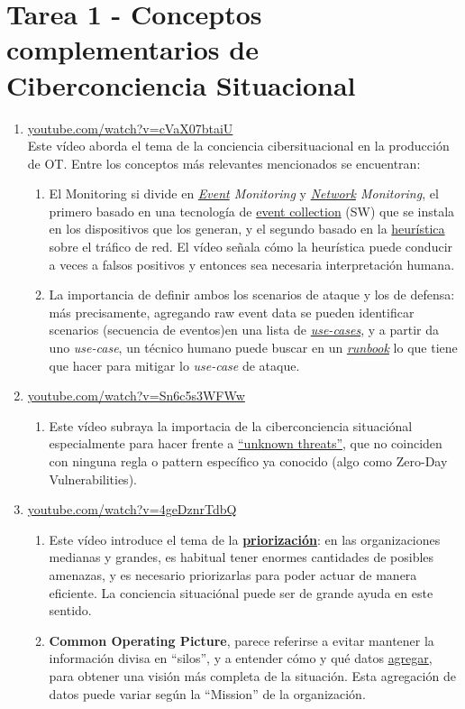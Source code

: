 \chapter{Tarea 1 - Conceptos complementarios de Ciberconciencia Situacional}

\begin{enumerate}
   \item 
   \href{https://www.youtube.com/watch?v=cVaX07btaiU}{youtube.com/watch?v=cVaX07btaiU}\\
   Este vídeo aborda el tema de la conciencia cibersituacional en la producción de OT.
   Entre los conceptos más relevantes mencionados se encuentran:
   \begin{enumerate}
      \item El Monitoring si divide en \textit{\ul{Event} Monitoring} y \textit{\ul{Network} Monitoring}, el primero basado en una tecnología de \ul{event collection} (SW) que se instala en los dispositivos que los generan, y el segundo basado en la \ul{heurística} sobre el tráfico de red. El vídeo señala cómo la heurística puede conducir a veces a falsos positivos y entonces sea necesaria interpretación humana.
      \item La importancia de definir ambos los scenarios de ataque y los de defensa: más precisamente, agregando raw event data se pueden identificar scenarios (secuencia de eventos)en una lista de \textit{\ul{use-cases}}, y a partir da uno \textit{use-case}, un técnico humano puede buscar en un \textit{\ul{runbook}} lo que tiene que hacer para mitigar lo \textit{use-case} de ataque.  
   \end{enumerate}
   \item \href{https://www.youtube.com/watch?v=Sn6c5s3WFWw}{youtube.com/watch?v=Sn6c5s3WFWw}
   \begin{enumerate}
      \item Este vídeo subraya la importacia de la ciberconciencia situaciónal  especialmente para hacer frente a \ul{``unknown threats''}, que no coinciden con ninguna regla o pattern específico ya conocido (algo como Zero-Day Vulnerabilities).
   \end{enumerate}
   \item \href{https://www.youtube.com/watch?v=4geDznrTdbQ}{youtube.com/watch?v=4geDznrTdbQ}
   \begin{enumerate}
      \item Este vídeo introduce el tema de la \textbf{\ul{priorización}}: en las organizaciones medianas y grandes, es habitual tener enormes cantidades de posibles amenazas, y es necesario priorizarlas para poder actuar de manera eficiente. La conciencia situaciónal puede ser de grande ayuda en este sentido.
      \item \textbf{Common Operating Picture}, parece referirse a evitar mantener la información divisa en ``silos'', y a entender cómo y qué datos \ul{agregar}, para obtener una visión más completa de la situación. Esta agregación de datos puede variar según la ``Mission'' de la organización. 
   \end{enumerate}
\end{enumerate}

